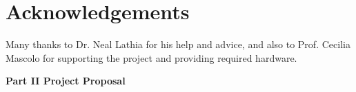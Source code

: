 \documentclass[12pt,a4paper,twoside,openright]{report}
\begin{document}
\tableofcontents

\listoffigures

\listoftables

\newpage
\section*{Acknowledgements}

Many thanks to Dr. Neal Lathia for his help and advice, and also to Prof. Cecilia Mascolo for supporting the project and providing required hardware.


\pagestyle{headings}












\printbibliography

\newpage

\pagestyle{empty}
\vspace*{60mm}
\begin{center}
  \Large
  \textbf{Part II Project Proposal} \\[5mm]
\end{center}


\end{document}
